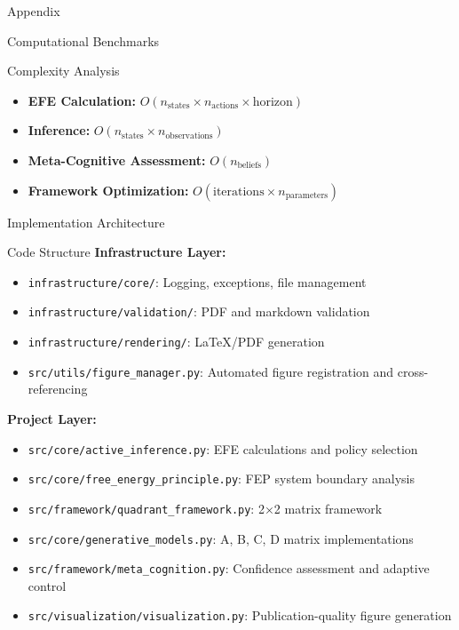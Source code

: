 \documentclass[
  ignorenonframetext,
]{beamer}
\providecommand{\tightlist}{%
  \setlength{\itemsep}{0pt}\setlength{\parskip}{0pt}}
\begin{document}
\begin{frame}[fragile]{Appendix}
\begin{block}{Computational Benchmarks}
\begin{block}{Complexity Analysis}
\protect{}\label{complexity-analysis}
\begin{itemize}
\tightlist
\item
  \textbf{EFE Calculation:}
  \(O(n_{\text{states}} \times n_{\text{actions}} \times \text{horizon})\)
\item
  \textbf{Inference:}
  \(O(n_{\text{states}} \times n_{\text{observations}})\)
\item
  \textbf{Meta-Cognitive Assessment:} \(O(n_{\text{beliefs}})\)
\item
  \textbf{Framework Optimization:}
  \(O(\text{iterations} \times n_{\text{parameters}})\)
\end{itemize}
\end{block}
\end{block}

\begin{block}{Implementation Architecture}
\protect{}\label{sec:implementation_architecture}
\begin{block}{Code Structure}
\protect{}\label{code-structure}
\textbf{Infrastructure Layer:}

\begin{itemize}
\tightlist
\item
  \texttt{infrastructure/core/}: Logging, exceptions, file management
\item
  \texttt{infrastructure/validation/}: PDF and markdown validation
\item
  \texttt{infrastructure/rendering/}: LaTeX/PDF generation
\item
  \texttt{src/utils/figure\_manager.py}: Automated figure registration
  and cross-referencing
\end{itemize}

\textbf{Project Layer:}

\begin{itemize}
\tightlist
\item
  \texttt{src/core/active\_inference.py}: EFE calculations and policy
  selection
\item
  \texttt{src/core/free\_energy\_principle.py}: FEP system boundary
  analysis
\item
  \texttt{src/framework/quadrant\_framework.py}: 2×2 matrix framework
\item
  \texttt{src/core/generative\_models.py}: A, B, C, D matrix
  implementations
\item
  \texttt{src/framework/meta\_cognition.py}: Confidence assessment and
  adaptive control
\item
  \texttt{src/visualization/visualization.py}: Publication-quality
  figure generation
\end{itemize}
\end{block}


\end{block}
\end{frame}
\end{document}
